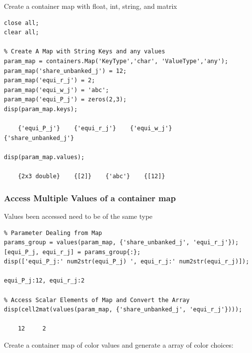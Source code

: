 \documentclass[
]{book}
\begin{document}
Create a container map with float, int, string, and matrix

\begin{verbatim}
close all;
clear all;

% Create A Map with String Keys and any values
param_map = containers.Map('KeyType','char', 'ValueType','any');
param_map('share_unbanked_j') = 12;
param_map('equi_r_j') = 2;
param_map('equi_w_j') = 'abc';
param_map('equi_P_j') = zeros(2,3);
disp(param_map.keys);

    {'equi_P_j'}    {'equi_r_j'}    {'equi_w_j'}    {'share_unbanked_j'}

disp(param_map.values);

    {2x3 double}    {[2]}    {'abc'}    {[12]}
\end{verbatim}

\hypertarget{access-multiple-values-of-a-container-map}{%
\subsubsection{Access Multiple Values of a container map}\label{access-multiple-values-of-a-container-map}}

Values been accessed need to be of the same type

\begin{verbatim}
% Parameter Dealing from Map
params_group = values(param_map, {'share_unbanked_j', 'equi_r_j'});
[equi_P_j, equi_r_j] = params_group{:};
disp(['equi_P_j:' num2str(equi_P_j) ', equi_r_j:' num2str(equi_r_j)]);

equi_P_j:12, equi_r_j:2

% Access Scalar Elements of Map and Convert the Array
disp(cell2mat(values(param_map, {'share_unbanked_j', 'equi_r_j'})));

    12     2
\end{verbatim}

Create a container map of color values and generate a array of color
choices:
\end{document}
